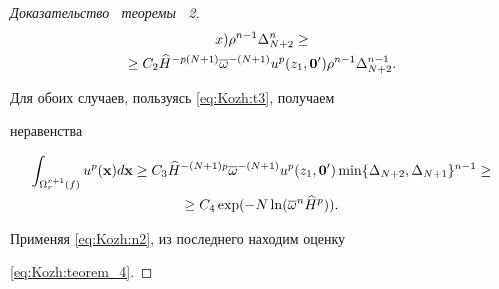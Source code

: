 \begin{proof}[Доказательство \, теоремы \, \rm 2]
\begin{multline*}
{x})\rho^{n-1}\Delta^{n}_{N+2}\geq\\

\geq C_2\widehat{H}^{-p(N+1)}\overline{\omega}^{-(N+1)}

u^{p}(z_1,{\bf 0}')\rho^{n-1}\Delta_{N+2}^{n-1}.

\end{multline*}

Для обоих случаев, пользуясь \eqref{eq:Kozh:t3}, получаем

неравенства

\begin{multline*}

\int _{\Omega_{r}^{{r+1}}(f)}u^{p}({\bf x})d{\bf x}\geq

C_3\widehat{H}^{-(N+1)p}\overline{\omega}^{-(N+1)} u^{p}(z_1,{\bf

0}')\min\{\Delta_{N+2},\Delta_{N+1}\}^{n-1}\geq \\

\geq C_4\exp(-N\ln(\overline{\omega}^{n}\widehat{H}^{p})).

\end{multline*}

Применяя \eqref{eq:Kozh:n2}, из последнего находим оценку

\eqref{eq:Kozh:teorem_4}.

\end{proof}





